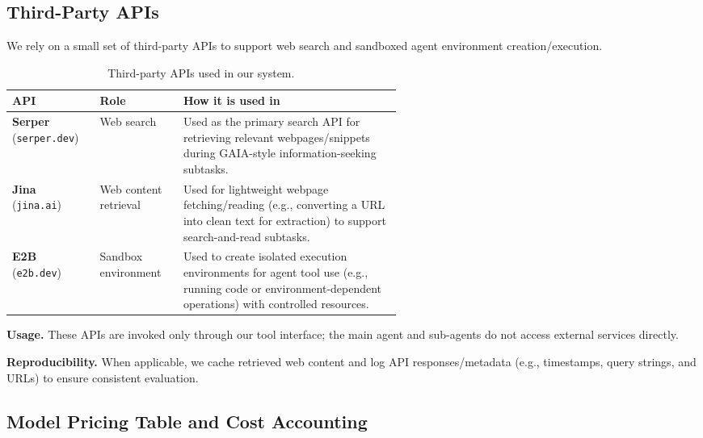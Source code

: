 \subsection{Third-Party APIs}
\label{app:E1}


We rely on a small set of third-party APIs to support web search and sandboxed agent environment creation/execution.

\begin{table}[h]
\centering
\small
\begin{threeparttable}
\caption{Third-party APIs used in our system.}
\label{tab:third_party_apis}
\begin{tabular}{l l p{0.56\linewidth}}
\toprule
\textbf{API} & \textbf{Role} & \textbf{How it is used in \our{}} \\
\midrule
\textbf{Serper} (\texttt{serper.dev}) & Web search & Used as the primary search API for retrieving relevant webpages/snippets during GAIA-style information-seeking subtasks. \\
\textbf{Jina} (\texttt{jina.ai}) & Web content retrieval & Used for lightweight webpage fetching/reading (e.g., converting a URL into clean text for extraction) to support search-and-read subtasks. \\
\textbf{E2B} (\texttt{e2b.dev}) & Sandbox environment & Used to create isolated execution environments for agent tool use (e.g., running code or environment-dependent operations) with controlled resources. \\
\bottomrule
\end{tabular}
\begin{tablenotes}[flushleft]\footnotesize
\item \textbf{Usage.} These APIs are invoked only through our tool interface; the main agent and sub-agents do not access external services directly.
\item \textbf{Reproducibility.} When applicable, we cache retrieved web content and log API responses/metadata (e.g., timestamps, query strings, and URLs) to ensure consistent evaluation.
\end{tablenotes}
\end{threeparttable}
\end{table}



\subsection{Model Pricing Table and Cost Accounting}
\label{app:E2}

